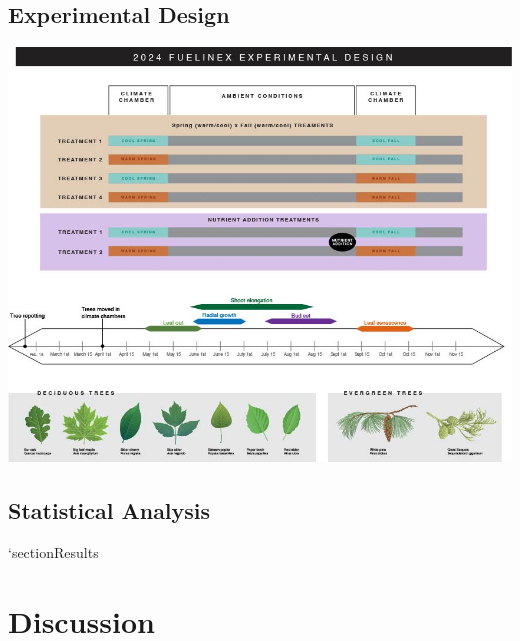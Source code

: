 \documentclass{article}
\begin{document}
\subsection{Experimental Design}
\includegraphics[]{../experimental_design/Fuelinex_Design_V4.jpg}

\subsection{Statistical Analysis}
`section{Results}
\section{Discussion}

\printbibliography
\end{document}
